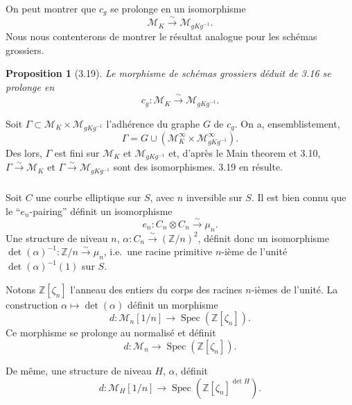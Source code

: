 \documentclass[11pt,a4paper]{amsart}
\theoremstyle{plain}
\newtheorem{proposition}[theorem]{Proposition}
\theoremstyle{definition}
\DeclareMathOperator{\Spec}{Spec}
\newcommand{\CM}{\mathcal{M}}
\newcommand{\mll}{\mathcal{M}}
\newcommand{\ZZ}{\mathbb{Z}}
\begin{document}
\subsubsection{}
On peut montrer que $c_g$ se prolonge en un isomorphisme
\[
\mll_K \xrightarrow{\sim} \mll_{gKg^{-1}}.
\]
Nous nous contenterons de montrer le r\'esultat analogue pour les sch\'emas grossiers.

\begin{proposition}[3.19]
Le morphisme de sch\'emas grossiers d\'eduit de 3.16 se prolonge en
\[
c_g \colon \CM_K \xrightarrow{\sim} \CM_{gKg^{-1}}.
\]
\end{proposition}

Soit $\Gamma \subset \CM_K \times \CM_{gKg^{-1}}$ l'adh\'erence du graphe $G$ de $c_g$. On a, ensemblistement,
\[
\Gamma = G \cup (\CM^{\infty}_K \times \CM^{\infty}_{gKg^{-1}}).
\]
Des lors, $\Gamma$ est fini sur $\CM_K$ et $\CM_{gKg^{-1}}$ et, d'apr\`es le Main theorem et 3.10, $\Gamma \xrightarrow{\sim} \CM_K$ et $\Gamma \xrightarrow{\sim} \CM_{gKg^{-1}}$ sont des isomorphismes. 3.19 en r\'esulte.

\subsubsection{}
Soit $C$ une courbe elliptique sur $S$, avec $n$ inversible sur $S$. Il est bien connu que le ``$e_n$-pairing'' d\'efinit un isomorphisme
\begin{equation}\label{eq:3.20.0}
e_n \colon C_n \otimes C_n \xrightarrow{\sim} \mu_n.
\end{equation}
Une structure de niveau $n$, $\alpha \colon C_n \xrightarrow{\sim} (\ZZ/n)^2$, d\'efinit donc un isomorphisme $\det(\alpha)^{-1} \colon \ZZ/n \xrightarrow{\sim} \mu_n$, i.e.\ une racine primitive $n$-i\`eme de l'unit\'e $\det(\alpha)^{-1}(1)$ sur $S$.

Notons $\ZZ[\zeta_n]$ l'anneau des entiers du corps des racines $n$-i\`emes de l'unit\'e. La construction $\alpha \mapsto \det(\alpha)$ d\'efinit un morphisme
\begin{equation}\label{eq:3.20.1}
d \colon \mll_n[1/n] \longrightarrow \Spec(\ZZ[\zeta_n]).
\end{equation}
Ce morphisme se prolonge au normalis\'e et d\'efinit
\begin{equation}\label{eq:3.20.2}
d \colon \CM_n \longrightarrow \Spec(\ZZ[\zeta_n]).
\end{equation}

De m\^eme, une structure de niveau $H$, $\alpha$, d\'efinit
\begin{equation}\label{eq:3.20.3}
d \colon \mll_H[1/n] \longrightarrow \Spec(\ZZ[\zeta_n]^{\det H}).
\end{equation}
\end{document}
